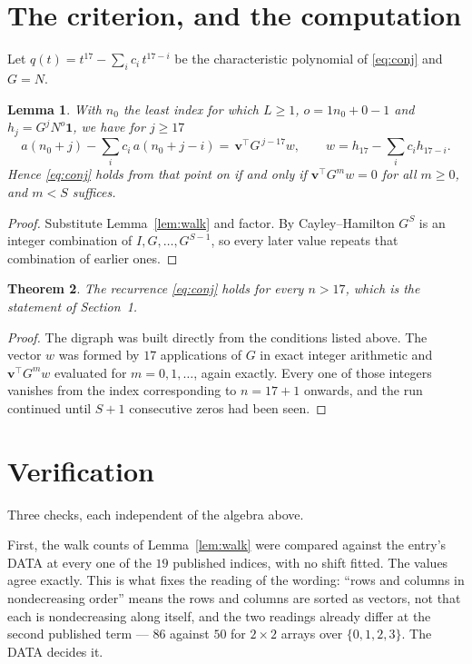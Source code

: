 \documentclass[11pt,a4paper]{article}
\theoremstyle{plain}
\newtheorem{theorem}{Theorem}
\newtheorem{lemma}[theorem]{Lemma}
\theoremstyle{definition}
\begin{document}
\section{The criterion, and the computation}

Let $q(t)=t^{17}-\sum_i c_i\,t^{17-i}$ be the characteristic polynomial of
\eqref{eq:conj} and $G=N$.

\begin{lemma}\label{lem:crit}
With $n_0$ the least index for which $L\ge1$, $o=1n_0+0-1$ and
$h_j=G^{j}N^{o}\mathbf{1}$, we have for $j\ge17$
\[
a(n_0+j)-\sum_i c_i\,a(n_0+j-i)=\,\mathbf{v}^{\!\top}G^{\,j-17}w,
\qquad w=h_{17}-\sum_i c_ih_{17-i} .
\]
Hence \eqref{eq:conj} holds from that point on if and only if
$\mathbf{v}^{\!\top}G^{m}w=0$ for all $m\ge0$, and $m<S$ suffices.
\end{lemma}

\begin{proof}
Substitute Lemma~\ref{lem:walk} and factor. By Cayley--Hamilton $G^{S}$ is an integer
combination of $I,G,\dots,G^{S-1}$, so every later value repeats that combination of
earlier ones.
\end{proof}

\begin{theorem}
The recurrence \eqref{eq:conj} holds for every $n>17$, which is the statement of
Section~1.
\end{theorem}

\begin{proof}
The digraph was built directly from the conditions listed above. The vector $w$ was formed by
$17$ applications of $G$ in exact integer arithmetic and $\mathbf{v}^{\!\top}G^{m}w$
evaluated for $m=0,1,\dots$, again exactly. Every one of those integers vanishes from the
index corresponding to $n=17+1$ onwards, and the run continued until $S+1$ consecutive
zeros had been seen.
\end{proof}

\section{Verification}

Three checks, each independent of the algebra above.

First, the walk counts of Lemma~\ref{lem:walk} were compared against the entry's DATA at
every one of the $19$ published indices, with no shift fitted. The values agree exactly.
This is what fixes the reading of the wording: ``rows and columns in nondecreasing order''
means the rows and columns are sorted as vectors, not that each is nondecreasing along
itself, and the two readings already differ at the second published term --- $86$ against
$50$ for $2\times2$ arrays over $\{0,1,2,3\}$. The DATA decides it.
\end{document}
